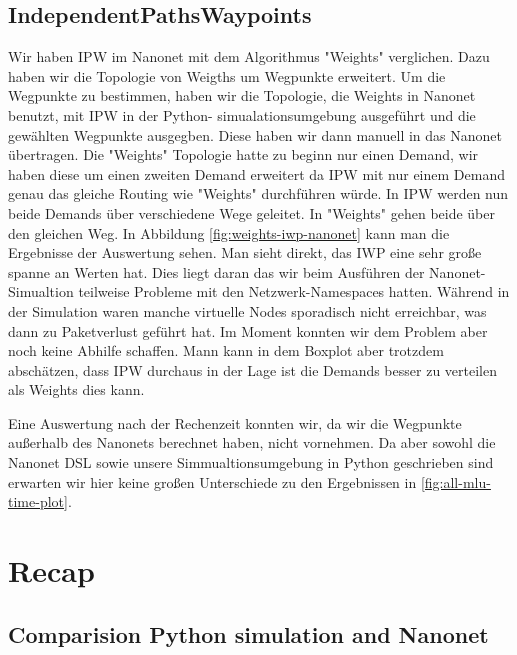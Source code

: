 \documentclass[sigconf,noacm,review]{acmart}
\begin{document}
\subsection{IndependentPathsWaypoints}
Wir haben IPW im Nanonet mit dem Algorithmus "Weights" verglichen. Dazu haben wir die Topologie von Weigths um Wegpunkte erweitert.
Um die Wegpunkte zu bestimmen, haben wir die Topologie, die Weights in Nanonet benutzt, mit IPW in der Python- simualationsumgebung ausgeführt und die gewählten Wegpunkte ausgegben.
Diese haben wir dann manuell in das Nanonet übertragen.
Die "Weights" Topologie hatte zu beginn nur einen Demand, wir haben diese um einen zweiten Demand erweitert da IPW mit nur einem Demand genau das gleiche Routing wie "Weights" durchführen würde.
In IPW werden nun beide Demands über verschiedene Wege geleitet. In "Weights" gehen beide über den gleichen Weg.
In Abbildung \ref{fig:weights-iwp-nanonet} kann man die Ergebnisse der Auswertung sehen.
Man sieht direkt, das IWP eine sehr große spanne an Werten hat. 
Dies liegt daran das wir beim Ausführen der Nanonet-Simualtion teilweise Probleme mit den Netzwerk-Namespaces hatten. 
Während in der Simulation waren manche virtuelle Nodes sporadisch nicht erreichbar, was dann zu Paketverlust geführt hat.
Im Moment konnten wir dem Problem aber noch keine Abhilfe schaffen.
Mann kann in dem Boxplot aber trotzdem abschätzen, dass IPW durchaus in der Lage ist die Demands besser zu verteilen als Weights dies kann.

Eine Auswertung nach der Rechenzeit konnten wir, da wir die Wegpunkte außerhalb des Nanonets berechnet haben, nicht vornehmen.
Da aber sowohl die Nanonet DSL sowie unsere Simmualtionsumgebung in Python geschrieben sind erwarten wir hier keine großen Unterschiede zu den Ergebnissen in \ref{fig:all-mlu-time-plot}.


\section{Recap}
\subsection{Comparision Python simulation and Nanonet}
\end{document}
